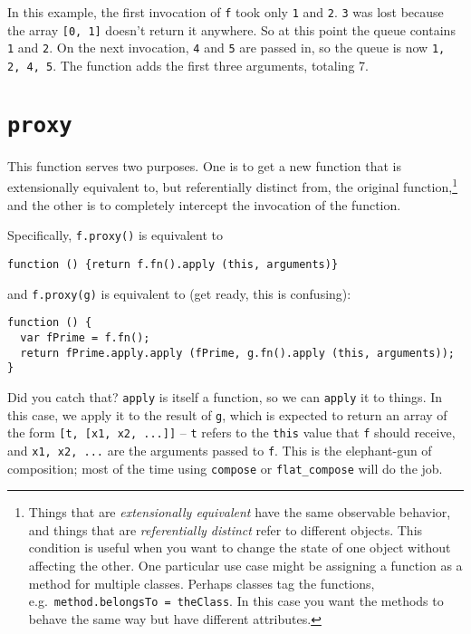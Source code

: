 \documentclass{report}
\begin{document}
      \noindent In this example, the first invocation of \verb|f| took only \verb|1| and \verb|2|. \verb|3| was lost because the array \verb|[0, 1]| doesn't return it anywhere. So at this
      point the queue contains \verb|1| and \verb|2|. On the next invocation, \verb|4| and \verb|5| are passed in, so the queue is now \verb|1, 2, 4, 5|. The function adds the first three
      arguments, totaling 7.

\section {{\tt proxy}}
      This function serves two purposes. One is to get a new function that is extensionally equivalent to, but referentially distinct from, the original function,\footnote{Things that are
      {\em extensionally equivalent} have the same observable behavior, and things that are {\em referentially distinct} refer to different objects. This condition is useful when you want to
      change the state of one object without affecting the other. One particular use case might be assigning a function as a method for multiple classes. Perhaps classes tag the functions,
      e.g.~{\tt method.belongsTo = theClass}. In this case you want the methods to behave the same way but have different attributes.} and the other is to completely intercept the invocation
      of the function.

      Specifically, \verb|f.proxy()| is equivalent to

\begin{verbatim}
function () {return f.fn().apply (this, arguments)}
\end{verbatim}

      \noindent and \verb|f.proxy(g)| is equivalent to (get ready, this is confusing):

\begin{verbatim}
function () {
  var fPrime = f.fn();
  return fPrime.apply.apply (fPrime, g.fn().apply (this, arguments));
}
\end{verbatim}

      Did you catch that? \verb|apply| is itself a function, so we can \verb|apply| it to things. In this case, we apply it to the result of \verb|g|, which is expected to return an array of
      the form \verb|[t, [x1, x2, ...]]| -- \verb|t| refers to the \verb|this| value that \verb|f| should receive, and \verb|x1, x2, ...| are the arguments passed to \verb|f|. This is the
      elephant-gun of composition; most of the time using \verb|compose| or \verb|flat_compose| will do the job.
\end{document}

